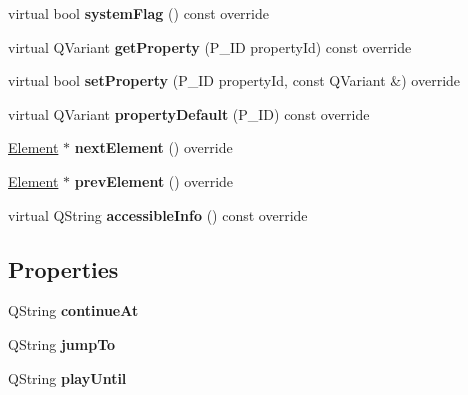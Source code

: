 \begin{DoxyCompactItemize}
\mbox{\label{class_ms_1_1_jump_a59f5fb9c5c85ac5223bd6614a608b4a5}} 
virtual bool {\bfseries system\+Flag} () const override
\item 
\mbox{\label{class_ms_1_1_jump_ad96992beb7044cef1967e2fdf495d1a5}} 
virtual Q\+Variant {\bfseries get\+Property} (P\+\_\+\+ID property\+Id) const override
\item 
\mbox{\label{class_ms_1_1_jump_a38cfe1eca8d923bace40bfb8e6b7d417}} 
virtual bool {\bfseries set\+Property} (P\+\_\+\+ID property\+Id, const Q\+Variant \&) override
\item 
\mbox{\label{class_ms_1_1_jump_a53f6fd9c8859030df4e158864eef95c6}} 
virtual Q\+Variant {\bfseries property\+Default} (P\+\_\+\+ID) const override
\item 
\mbox{\label{class_ms_1_1_jump_aeb447d97dfc67731e949bdf0d55853b8}} 
\hyperlink{class_ms_1_1_element}{Element} $\ast$ {\bfseries next\+Element} () override
\item 
\mbox{\label{class_ms_1_1_jump_a7eb52c1ebfa6a6a10d669ee6ce175c6f}} 
\hyperlink{class_ms_1_1_element}{Element} $\ast$ {\bfseries prev\+Element} () override
\item 
\mbox{\label{class_ms_1_1_jump_a6666a736facd3361777357bc89b17355}} 
virtual Q\+String {\bfseries accessible\+Info} () const override
\end{DoxyCompactItemize}
\subsection*{Properties}
\begin{DoxyCompactItemize}
\item 
\mbox{\label{class_ms_1_1_jump_a9832bc15a5015332519e85345989d0ca}} 
Q\+String {\bfseries continue\+At}
\item 
\mbox{\label{class_ms_1_1_jump_a12ef3ffbf206e88e232e2c6b0955b152}} 
Q\+String {\bfseries jump\+To}
\item 
\mbox{\label{class_ms_1_1_jump_a220b2e9524c19f7ec53e2a2a0e2a116f}} 
Q\+String {\bfseries play\+Until}
\end{DoxyCompactItemize}
